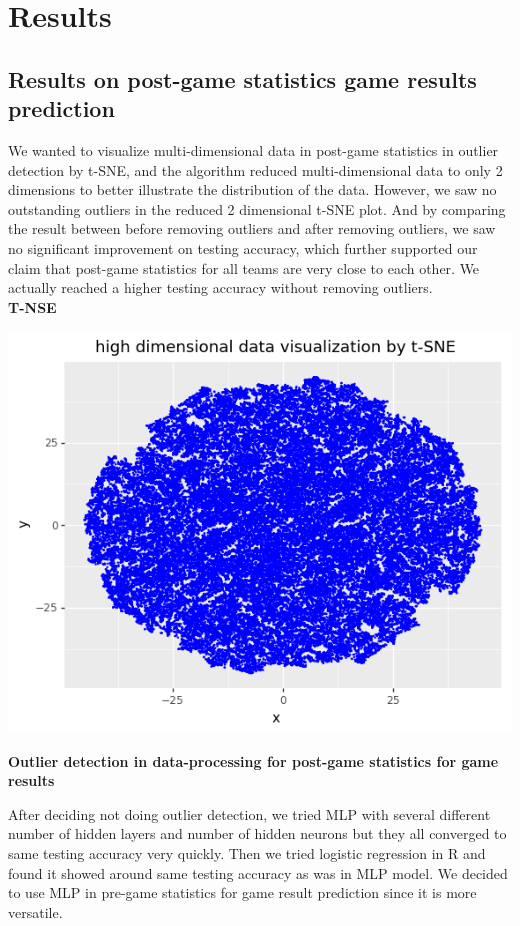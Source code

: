 \documentclass[12pt]{article}
\begin{document}
\section{Results}
\subsection{Results on post-game statistics game results prediction}
\quad We wanted to visualize multi-dimensional data in post-game statistics in outlier detection by t-SNE, and the algorithm reduced multi-dimensional data to only 2 dimensions to better illustrate the distribution of the data. However, we saw no outstanding outliers in the reduced 2 dimensional t-SNE plot. And by comparing the result between before removing outliers and after removing outliers, we saw no significant improvement on testing accuracy, which further supported our claim that post-game statistics for all teams are very close to each other. We actually reached a higher testing accuracy without removing outliers. \\

\textbf{T-NSE}

\includegraphics[scale=0.9]{tsne.png} 

\textbf{Outlier detection in data-processing for post-game statistics for game results}

\quad After deciding not doing outlier detection, we tried MLP with several different number of hidden layers and number of hidden neurons but they all converged to same testing accuracy very quickly. Then we tried logistic regression in R and found it showed around same testing accuracy as was in MLP model. We decided to use MLP in pre-game statistics for game result prediction since it is more versatile. \\ 
\end{document}
